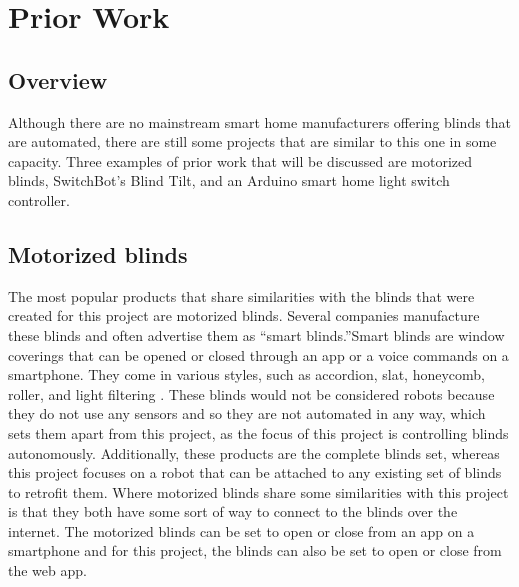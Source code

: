 \documentclass[10pt,twocolumn]{article}
\begin{document}
\section{Prior Work}
\subsection{Overview}
Although there are no mainstream smart home manufacturers offering blinds that are automated, there are still some projects that are similar to this one in some capacity. Three examples of prior work that will be discussed are motorized blinds, SwitchBot’s Blind Tilt, and an Arduino smart home light switch controller. 

\subsection{Motorized blinds}
The most popular products that share similarities with the blinds that were created for this project are motorized blinds. Several companies manufacture these blinds and often advertise them as “smart blinds.”Smart blinds are window coverings that can be opened or closed through an app or a voice commands on a smartphone. They come in various styles, such as accordion, slat, honeycomb, roller, and light filtering \cite{Alina20228BestSmartBlinds}. These blinds would not be considered robots because they do not use any sensors and so they are not automated in any way, which sets them apart from this project, as the focus of this project is controlling blinds autonomously. Additionally, these products are the complete blinds set, whereas this project focuses on a robot that can be attached to any existing set of blinds to retrofit them. Where motorized blinds share some similarities with this project is that they both have some sort of way to connect to the blinds over the internet. The motorized blinds can be set to open or close from an app on a smartphone and for this project, the blinds can also be set to open or close from the  web app.
\end{document}
